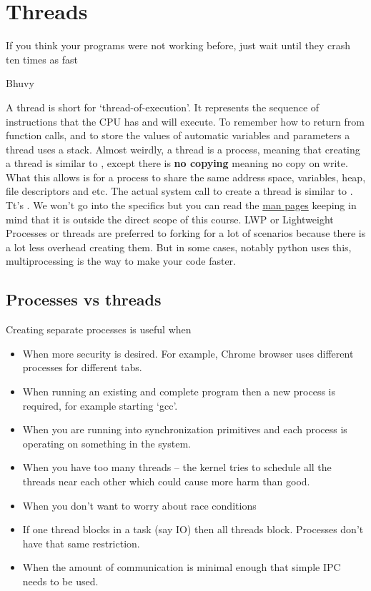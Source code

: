 \chapter{Threads}

\epigraph{If you think your programs were not working before, just wait until they crash ten times as fast}{Bhuvy}

A thread is short for `thread-of-execution'.
It represents the sequence of instructions that the CPU has and will execute.
To remember how to return from function calls, and to store the values of automatic variables and parameters a thread uses a stack.
Almost weirdly, a thread is a process, meaning that creating a thread is similar to , except there is \textbf{no copying} meaning no copy on write.
What this allows is for a process to share the same address space, variables, heap, file descriptors and etc.
The actual system call to create a thread is similar to . Tt's .
We won't go into the specifics but you can read the \href{http://man7.org/linux/man-pages/man2/clone.2.html}{man pages} keeping in mind that it is outside the direct scope of this course.
LWP or Lightweight Processes or threads are preferred to forking for a lot of scenarios because there is a lot less overhead creating them.
But in some cases, notably python uses this, multiprocessing is the way to make your code faster.

\section{Processes vs threads}

Creating separate processes is useful when

\begin{itemize}
\item When more security is desired. For example, Chrome browser uses different processes for different tabs.
\item When running an existing and complete program then a new process is required, for example starting `gcc'.
\item When you are running into synchronization primitives and each process is operating on something in the system.
\item When you have too many threads -- the kernel tries to schedule all the threads near each other which could cause more harm than good.
\item When you don't want to worry about race conditions
\item If one thread blocks in a task (say IO) then all threads block. Processes don't have that same restriction.
\item When the amount of communication is minimal enough that simple IPC needs to be used.
\end{itemize}

